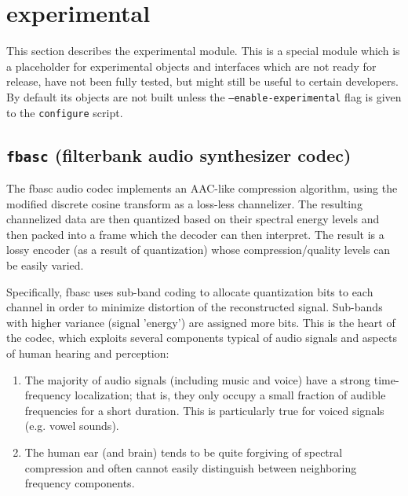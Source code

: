 % 
%

\newpage
\section{experimental}
\label{module:experimental}
This section describes the experimental module.
This is a special module which is a placeholder for experimental objects
and interfaces which are not ready for release, have not been fully
tested, but might still be useful to certain developers.
By default its objects are not built unless the
{\tt --enable-experimental} flag is given to the {\tt configure} script.

\subsection{{\tt fbasc} (filterbank audio synthesizer codec)}
\label{module:experimental:fbasc}

The fbasc audio codec implements an AAC-like compression algorithm, using the
modified discrete cosine transform as a loss-less channelizer.  The resulting
channelized data are then quantized based on their spectral energy levels and
then packed into a frame which the decoder can then interpret. The result is a
lossy encoder (as a result of quantization) whose compression/quality levels
can be easily varied.


Specifically, fbasc uses sub-band coding to allocate quantization bits to each
channel in order to minimize distortion of the reconstructed signal. Sub-bands
with higher variance (signal 'energy') are assigned more bits.  This is the
heart of the codec, which exploits several components typical of audio signals
and aspects of human hearing and perception:
\begin{enumerate}
\item The majority of audio signals (including music and voice) have a
      strong time-frequency localization; that is, they only occupy a small
      fraction of audible frequencies for a short duration.  This is
      particularly true for voiced signals (e.g. vowel sounds).
\item The human ear (and brain) tends to be quite forgiving of spectral
      compression and often cannot easily distinguish between neighboring
      frequency components.
\end{enumerate}

